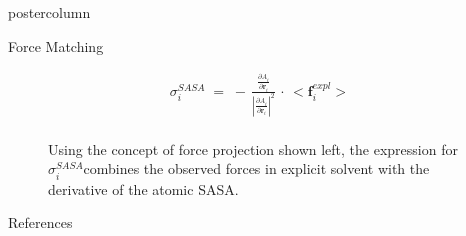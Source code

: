 \documentclass{beamer}
\newcommand{\sig}{$\sigma_i^{SASA}$}
\begin{document}
\begin{frame}
\begin{columns}
\begin{column}{.43\textwidth}
\begin{beamercolorbox}[center]{postercolumn}
\begin{minipage}{.98\textwidth}
{\begin{myblock}{Force Matching}
\begin{figure}
\begin{minipage}{0.43\textwidth}
\begin{gather}
	\nonumber \sigma_i^{SASA} \; = \; - \, \frac{ \frac{ \partial A_i} { \partial \mathbf{r}_i} }
		{\left| \frac{ \partial A_i} { \partial \mathbf{r}_i} \right| ^2 }
			\, \cdot \, <\mathbf{f}_i^{expl}> \\
	\nonumber \quad
\end{gather}
\begin{table}
\caption{Using the concept of force projection shown left,
the expression for \sig combines the observed forces in explicit
solvent with the derivative of the atomic SASA.}
\end{table}
\end{minipage}
\end{figure}
\end{myblock}\vfill
\begin{myblock}{References}
\footnotesize


\end{myblock}\vfill
}\end{minipage}
\end{beamercolorbox}
\end{column}
\end{columns}
\end{frame}
\end{document}
